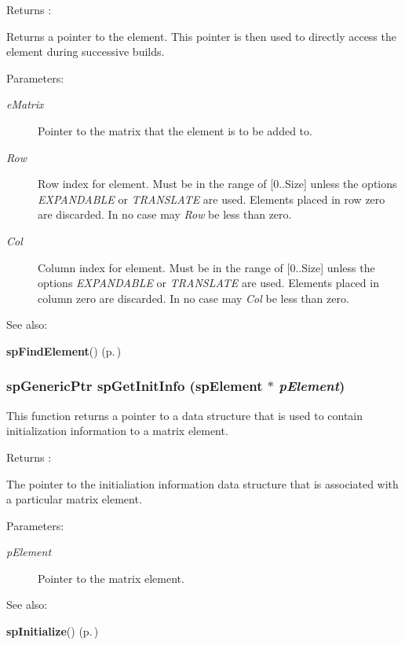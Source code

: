 \begin{Desc}
\item[Returns :]\par
 Returns a pointer to the element. This pointer is then used to directly access the element during successive builds.\end{Desc}
\begin{Desc}
\item[Parameters: ]\par
\begin{description}
\item[{\em 
e\-Matrix}]Pointer to the matrix that the element is to be added to. \item[{\em 
Row}]Row index for element. Must be in the range of [0..Size] unless the options {\em EXPANDABLE} or {\em TRANSLATE} are used. Elements placed in row zero are discarded. In no case may {\em Row} be less than zero. \item[{\em 
Col}]Column index for element. Must be in the range of [0..Size] unless the options {\em EXPANDABLE} or {\em TRANSLATE} are used. Elements placed in column zero are discarded. In no case may {\em Col} be less than zero.\end{description}
\end{Desc}
\begin{Desc}
\item[See also: ]\par
{\bf sp\-Find\-Element}() {\rm (p.\,\pageref{spBuild_8c_a11})} \end{Desc}
\subsubsection{\setlength{\rightskip}{0pt plus 5cm}sp\-Generic\-Ptr sp\-Get\-Init\-Info ({\bf sp\-Element} $\ast$ {\em p\-Element})}\label{spBuild_8c_a23}


This function returns a pointer to a data structure that is used to contain initialization information to a matrix element.

\begin{Desc}
\item[Returns :]\par
 The pointer to the initialiation information data structure that is associated with a particular matrix element.\end{Desc}
\begin{Desc}
\item[Parameters: ]\par
\begin{description}
\item[{\em 
p\-Element}]Pointer to the matrix element.\end{description}
\end{Desc}
\begin{Desc}
\item[See also: ]\par
{\bf sp\-Initialize}() {\rm (p.\,\pageref{spBuild_8c_a21})} \end{Desc}
